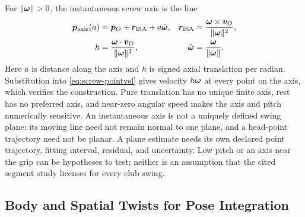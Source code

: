 For $\lVert\bm{\omega}\rVert>0$, the instantaneous screw axis is the line
\begin{equation}
\label{eq:screw-isa}
\begin{aligned}
\bm{p}_{\mathrm{axis}}(a)&=\bm{p}_O+\bm{r}_{\mathrm{ISA}}+a\hat{\bm{\omega}},
&\bm{r}_{\mathrm{ISA}}&=\frac{\bm{\omega}\times\bm{v}_O}{\lVert\bm{\omega}\rVert^2},\\
h&=\frac{\bm{\omega}\cdot\bm{v}_O}{\lVert\bm{\omega}\rVert^2},
&\hat{\bm{\omega}}&=\frac{\bm{\omega}}{\lVert\bm{\omega}\rVert}.
\end{aligned}
\end{equation}
Here $a$ is distance along the axis and $h$ is signed axial translation per radian.
Substitution into \cref{eq:screw-pointvel} gives velocity $h\bm{\omega}$ at every point on the axis, which verifies the construction.
Pure translation has no unique finite axis, rest has no preferred axis, and near-zero angular speed makes the axis and pitch numerically sensitive.
An instantaneous axis is not a uniquely defined swing plane: its moving line need not remain normal to one plane, and a head-point trajectory need not be planar.
A plane estimate needs its own declared point trajectory, fitting interval, residual, and uncertainty.
Low pitch or an axis near the grip can be hypotheses to test; neither is an assumption that the cited segment study licenses for every club swing.

\subsection{Body and Spatial Twists for Pose Integration}

